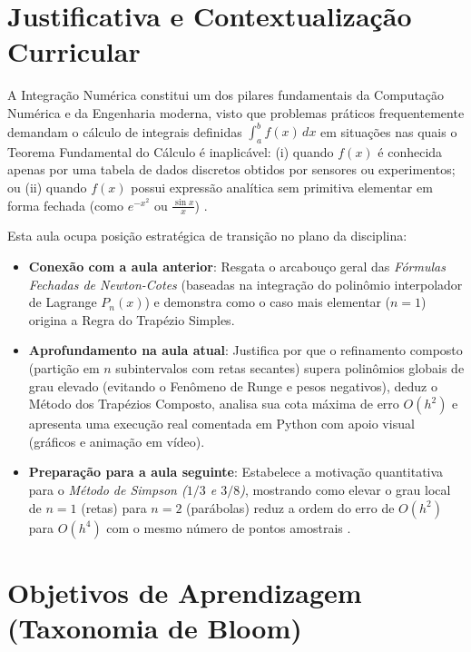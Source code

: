 \documentclass[11pt,a4paper]{article}
\begin{document}
\section{Justificativa e Contextualização Curricular}

A Integração Numérica constitui um dos pilares fundamentais da Computação Numérica e da Engenharia moderna, visto que problemas práticos frequentemente demandam o cálculo de integrais definidas $\int_a^b f(x)\,dx$ em situações nas quais o Teorema Fundamental do Cálculo é inaplicável: (i) quando $f(x)$ é conhecida apenas por uma tabela de dados discretos obtidos por sensores ou experimentos; ou (ii) quando $f(x)$ possui expressão analítica sem primitiva elementar em forma fechada (como $e^{-x^2}$ ou $\frac{\sin x}{x}$) \cite{santos2010, ruggiero1996, burden2016}.

Esta aula ocupa posição estratégica de transição no plano da disciplina:
\begin{itemize}[leftmargin=1.4em]
    \item \textbf{Conexão com a aula anterior}: Resgata o arcabouço geral das \emph{Fórmulas Fechadas de Newton-Cotes} (baseadas na integração do polinômio interpolador de Lagrange $P_n(x)$) e demonstra como o caso mais elementar ($n = 1$) origina a Regra do Trapézio Simples.
    \item \textbf{Aprofundamento na aula atual}: Justifica por que o refinamento composto (partição em $n$ subintervalos com retas secantes) supera polinômios globais de grau elevado (evitando o Fenômeno de Runge e pesos negativos), deduz o Método dos Trapézios Composto, analisa sua cota máxima de erro $O(h^2)$ e apresenta uma execução real comentada em Python com apoio visual (gráficos e animação em vídeo).
    \item \textbf{Preparação para a aula seguinte}: Estabelece a motivação quantitativa para o \emph{Método de Simpson ($1/3$ e $3/8$)}, mostrando como elevar o grau local de $n=1$ (retas) para $n=2$ (parábolas) reduz a ordem do erro de $O(h^2)$ para $O(h^4)$ com o mesmo número de pontos amostrais \cite{mesquita2026}.
\end{itemize}

\section{Objetivos de Aprendizagem (Taxonomia de Bloom)}
\end{document}
